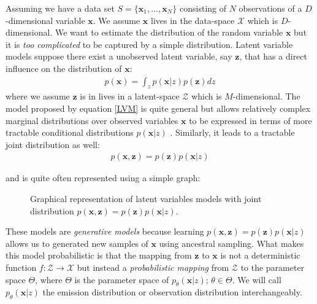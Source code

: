 \documentclass{article}
\newcommand{\x}{\mathbf{x}}
\newcommand{\z}{\mathbf{z}}
\begin{document}
Assuming we have a data set $S= \{\mathbf{x}_1,...,\mathbf{x}_N\}$ consisting of $N$ observations of a $D$-dimensional variable $\mathbf{x}$. We assume $\x$ lives in the data-space $\mathcal{X}$ which is $D$-dimensional. We want to estimate the distribution of the random variable $\mathbf{x}$ but it is \textit{too complicated} to be captured by a simple distribution. Latent variable models suppose there exist a unobserved latent variable, say $\mathbf{z}$, that has a direct influence on the distribution of $\mathbf{x}$:
\begin{align}
p(\x) = \int_{z} p(\x|z)p(\z) dz
\label{LVM}
\end{align}
where we assume $\z$ is in lives in a latent-space $\mathcal{Z}$ which is $M$-dimensional. The model proposed by equation \ref{LVM} is quite general but allows relatively complex marginal distributions over observed variables $\mathbf{x}$ to be expressed in terms of more tractable conditional distributions $p(\x|z)$ \cite{Bishop07}. Similarly, it leads to a tractable joint distribution as well:
\begin{align}
p(\x,\z) = p(\z)p(\x|z)
\label{jointLVM}
\end{align}

and is quite often represented using a simple graph:
\begin{figure}[h!]
  \centering
  \caption{Graphical representation of latent variables models with joint distribution $p(\mathbf{x},\mathbf{z}) = p(\mathbf{z})p(\mathbf{x}|z)$.}
  \label{genny}
\end{figure}%
These models are \textit{generative models} because learning $p(\x,\z)= p(\z)p(\x|z)$ allows us to generated new samples of $\x$ using ancestral sampling. What makes this model probabilistic is that the mapping from $\z$
 to $\x$ is not a deterministic function $f: \mathcal{Z} \rightarrow \mathcal{X}$ but instead a \textit{probabilistic mapping} from $\mathcal{Z}$ to the parameter space $\Theta$, where $\Theta$ is the parameter space of $p_\theta(\x|z)$; $\theta \in \Theta$. We will call $p_\theta(\x|z)$ the emission distribution or observation distribution interchangeably.
 
\end{document}
